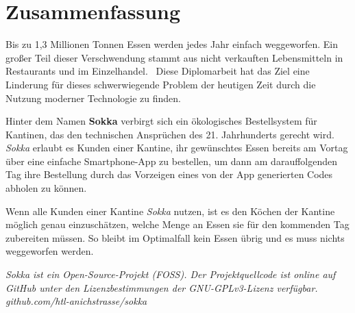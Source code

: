\section*{Zusammenfassung}

Bis zu 1,3 Millionen Tonnen Essen werden jedes Jahr einfach weggeworfen. Ein großer Teil dieser Verschwendung stammt aus nicht verkauften Lebensmitteln in Restaurants und im Einzelhandel.~\cite{depta2018} Diese Diplomarbeit hat das Ziel eine Linderung für dieses schwerwiegende Problem der heutigen Zeit durch die Nutzung moderner Technologie zu finden.

Hinter dem Namen \textbf{Sokka} verbirgt sich ein ökologisches Bestellsystem für Kantinen, das den technischen Ansprüchen des 21. Jahrhunderts gerecht wird. \textit{Sokka} erlaubt es Kunden einer Kantine, ihr gewünschtes Essen bereits am Vortag über eine einfache Smartphone-App zu bestellen, um dann am darauffolgenden Tag ihre Bestellung durch das Vorzeigen eines von der App generierten Codes abholen zu können.

Wenn alle Kunden einer Kantine \textit{Sokka} nutzen, ist es den Köchen der Kantine möglich genau einzuschätzen, welche Menge an Essen sie für den kommenden Tag zubereiten müssen. So bleibt im Optimalfall kein Essen übrig und es muss nichts weggeworfen werden.

\textit{Sokka ist ein Open-Source-Projekt (FOSS). Der Projektquellcode ist online auf GitHub unter den Lizenzbestimmungen der GNU-GPLv3-Lizenz verfügbar.\\github.com/htl-anichstrasse/sokka}

\newpage